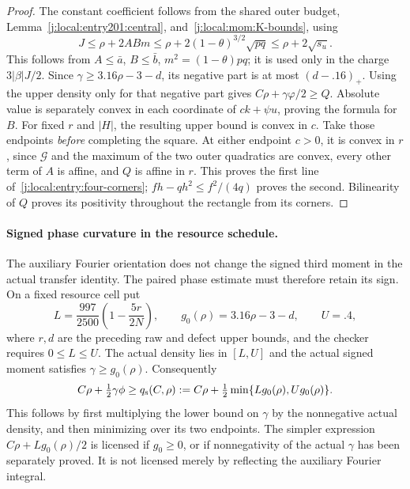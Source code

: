 \begin{proof}
The constant coefficient follows from the shared outer budget,
Lemma~\ref{j:local:entry201:central}, and~\eqref{j:local:mom:K-bounds}, using
\[
 J\le\rho+2ABm\le\rho+2(1-\theta)^{3/2}\sqrt{pq}
       \le\rho+2\sqrt{s_u}.
\]
This follows from $A\le\bar a$, $B\le\bar b$, $m^2=(1-\theta)pq$;
it is used only in the charge $3|\beta|J/2$. Since $\gamma\ge3.16\rho-3-d$, its negative
part is at most $(d-.16)_+$. Using the upper density only for that negative
part gives $C\rho+\gamma\varphi/2\ge Q$. Absolute value is separately
convex in each coordinate of $ck+\psi u$, proving the formula for $B$.
For fixed $r$ and $|H|$, the resulting upper bound is convex in $c$.
Take those endpoints \emph{before} completing the square. At either
endpoint $c>0$, it is convex in $r$, since $\mathcal G$ and the maximum of the two outer quadratics are
convex, every other term of $A$ is affine, and $Q$ is affine in $r$. This proves the first line of~\eqref{j:local:entry:four-corners};
$fh-qh^2\le f^2/(4q)$ proves the second. Bilinearity of $Q$ proves
its positivity throughout the rectangle from its corners.

\end{proof}

\paragraph{Signed phase curvature in the resource schedule.}
\label{j:local:re:signed-phase-repair}
The auxiliary Fourier orientation does not change the signed third moment
in the actual transfer identity. The paired phase estimate must therefore
retain its sign. On a fixed resource cell put
\[
 L=\frac{997}{2500}\left(1-\frac{5r}{2N}\right),\qquad
 g_0(\rho)=3.16\rho-3-d,\qquad U=.4,
\]
where $r,d$ are the preceding raw and defect upper bounds, and the
checker requires $0\le L\le U$. The actual density lies in $[L,U]$
and the actual signed moment satisfies $\gamma\ge g_0(\rho)$. Consequently
\begin{equation}\label{j:local:re:sign-aware-price}
 C\rho+\tfrac12\gamma\phi
 \ge q_{\rm s}(C,\rho):=
 C\rho+\tfrac12\min\{L g_0(\rho),U g_0(\rho)\}.
\end{equation}
This follows by first multiplying the lower bound on $\gamma$ by the
nonnegative actual density, and then minimizing over its two endpoints.
The simpler expression $C\rho+Lg_0(\rho)/2$ is licensed if $g_0\ge0$,
or if nonnegativity of the actual $\gamma$ has been separately proved.
It is not licensed merely by reflecting the auxiliary Fourier integral.

